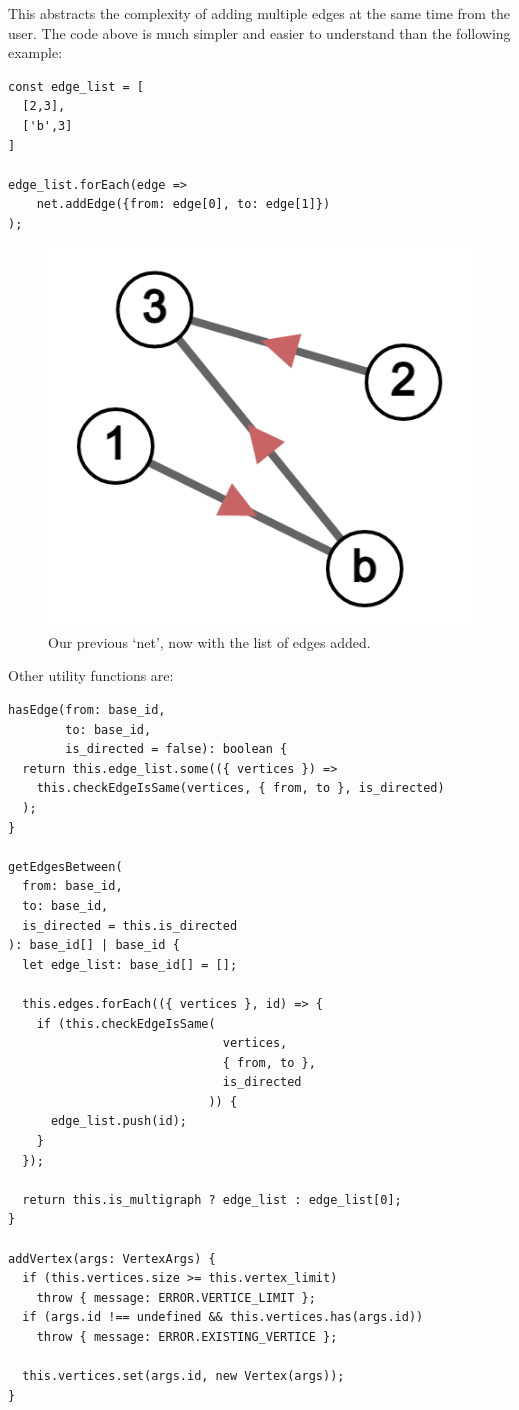This abstracts the complexity of adding multiple edges at the same time
from the user.
The code above is much simpler and easier to understand than the
following example:

\begin{verbatim}
const edge_list = [
  [2,3],
  ['b',3]
]

edge_list.forEach(edge =>
    net.addEdge({from: edge[0], to: edge[1]})
);
\end{verbatim}

\begin{figure}[H]
  \centering
  \includegraphics[scale=.25]{img/net_1b_edge_list.png}
  \caption{Our previous `net', now with the list of edges added.}
  \label{fig:net_edge_list}
\end{figure}

Other utility functions are:

\begin{verbatim}
hasEdge(from: base_id,
        to: base_id,
        is_directed = false): boolean {
  return this.edge_list.some(({ vertices }) =>
    this.checkEdgeIsSame(vertices, { from, to }, is_directed)
  );
}

getEdgesBetween(
  from: base_id,
  to: base_id,
  is_directed = this.is_directed
): base_id[] | base_id {
  let edge_list: base_id[] = [];

  this.edges.forEach(({ vertices }, id) => {
    if (this.checkEdgeIsSame(
                              vertices,
                              { from, to },
                              is_directed
                            )) {
      edge_list.push(id);
    }
  });

  return this.is_multigraph ? edge_list : edge_list[0];
}

addVertex(args: VertexArgs) {
  if (this.vertices.size >= this.vertex_limit)
    throw { message: ERROR.VERTICE_LIMIT };
  if (args.id !== undefined && this.vertices.has(args.id))
    throw { message: ERROR.EXISTING_VERTICE };

  this.vertices.set(args.id, new Vertex(args));
}
\end{verbatim}

